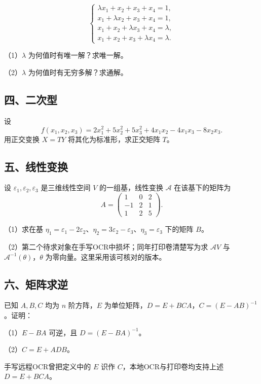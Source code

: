 \documentclass[11pt,fontset=fandol]{ctexart}
\begin{document}
\[
\begin{cases}
\lambda x_1+x_2+x_3+x_4=1,\\
x_1+\lambda x_2+x_3+x_4=1,\\
x_1+x_2+\lambda x_3+x_4=\lambda,\\
x_1+x_2+x_3+\lambda x_4=\lambda.
\end{cases}
\]

（1）\(\lambda\) 为何值时有唯一解？求唯一解。

（2）\(\lambda\) 为何值时有无穷多解？求通解。

\subsection{四、二次型}\label{ux56dbux4e8cux6b21ux578b}

设 \[
f(x_1,x_2,x_3)=2x_1^2+5x_2^2+5x_3^2+4x_1x_2-4x_1x_3-8x_2x_3.
\] 用正交变换 \(X=TY\) 将其化为标准形，求正交矩阵 \(T\)。

\subsection{五、线性变换}\label{ux4e94ux7ebfux6027ux53d8ux6362}

设 \(\varepsilon_1,\varepsilon_2,\varepsilon_3\) 是三维线性空间 \(V\)
的一组基，线性变换 \(\mathcal A\) 在该基下的矩阵为 \[
A=\begin{pmatrix}1&0&2\\-1&2&1\\1&2&5\end{pmatrix}.
\]

（1）求在基
\(\eta_1=\varepsilon_1-2\varepsilon_2\)、\(\eta_2=3\varepsilon_2-\varepsilon_3\)、\(\eta_3=\varepsilon_3\)
下的矩阵 \(B\)。

（2）第二个待求对象在手写OCR中损坏；同年打印卷清楚写为求 \(\mathcal AV\)
与 \(\mathcal A^{-1}(\theta)\)，\(\theta\)
为零向量。这里采用该可核对的版本。

\subsection{六、矩阵求逆}\label{ux516dux77e9ux9635ux6c42ux9006}

已知 \(A,B,C\) 均为 \(n\) 阶方阵，\(E\)
为单位矩阵，\(D=E+BCA\)，\(C=(E-AB)^{-1}\)。证明：

（1）\(E-BA\) 可逆，且 \(D=(E-BA)^{-1}\)。

（2）\(C=E+ADB\)。

手写远程OCR曾把定义中的 \(E\) 识作 \(C\)，本地OCR与打印卷均支持上述
\(D=E+BCA\)。
\end{document}
